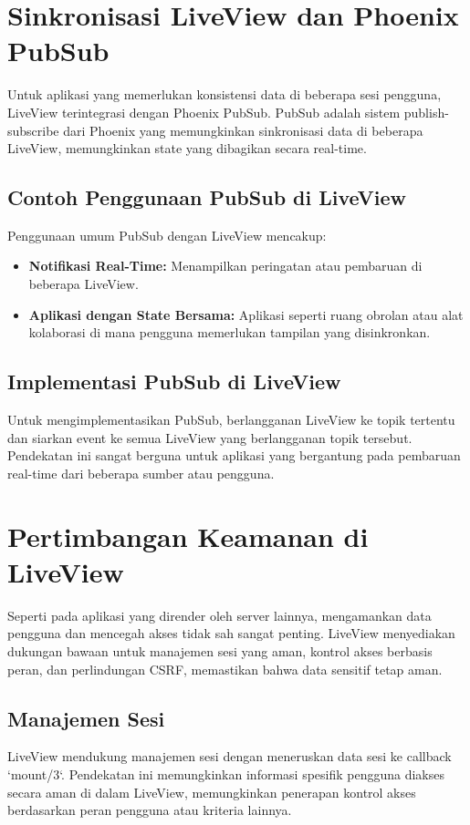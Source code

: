 \section{Sinkronisasi LiveView dan Phoenix PubSub}
Untuk aplikasi yang memerlukan konsistensi data di beberapa sesi pengguna, LiveView terintegrasi dengan Phoenix PubSub. PubSub adalah sistem publish-subscribe dari Phoenix yang memungkinkan sinkronisasi data di beberapa LiveView, memungkinkan state yang dibagikan secara real-time.

\subsection{Contoh Penggunaan PubSub di LiveView}
Penggunaan umum PubSub dengan LiveView mencakup:
\begin{itemize}
	\item \textbf{Notifikasi Real-Time:} Menampilkan peringatan atau pembaruan di beberapa LiveView.
	\item \textbf{Aplikasi dengan State Bersama:} Aplikasi seperti ruang obrolan atau alat kolaborasi di mana pengguna memerlukan tampilan yang disinkronkan.
\end{itemize}

\subsection{Implementasi PubSub di LiveView}
Untuk mengimplementasikan PubSub, berlangganan LiveView ke topik tertentu dan siarkan event ke semua LiveView yang berlangganan topik tersebut. Pendekatan ini sangat berguna untuk aplikasi yang bergantung pada pembaruan real-time dari beberapa sumber atau pengguna.

\section{Pertimbangan Keamanan di LiveView}
Seperti pada aplikasi yang dirender oleh server lainnya, mengamankan data pengguna dan mencegah akses tidak sah sangat penting. LiveView menyediakan dukungan bawaan untuk manajemen sesi yang aman, kontrol akses berbasis peran, dan perlindungan CSRF, memastikan bahwa data sensitif tetap aman.

\subsection{Manajemen Sesi}
LiveView mendukung manajemen sesi dengan meneruskan data sesi ke callback `mount/3`. Pendekatan ini memungkinkan informasi spesifik pengguna diakses secara aman di dalam LiveView, memungkinkan penerapan kontrol akses berdasarkan peran pengguna atau kriteria lainnya.

